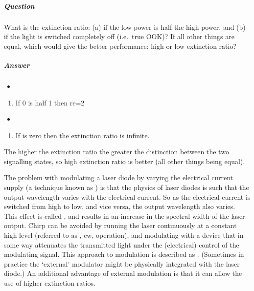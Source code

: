 \documentclass[letterpaper,10pt,english]{sphinxmanual}
\begin{document}
\subparagraph{Question}
\label{\detokenize{content/session_00/Part_00_02:Question}}
What is the extinction ratio: (a) if the low power is half the high power, and (b) if the light is switched completely off (i.e. true OOK)? If all other things are equal, which would give the better performance: high or low extinction ratio?


\subparagraph{Answer}
\label{\detokenize{content/session_00/Part_00_02:Answer}}\begin{itemize}
\item {} 
\end{itemize}
\begin{enumerate}
%
\item {} 
If 0 is half 1 then re=2

\end{enumerate}
\begin{itemize}
\item {} 
\end{itemize}
\begin{enumerate}
%
\setcounter{enumi}{1}
\item {} 
If  is zero then the extinction ratio is infinite.

\end{enumerate}

The higher the extinction ratio the greater the distinction between the two signalling states, so high extinction ratio is better (all other things being equal).

The problem with modulating a laser diode by varying the electrical current supply (a technique known as ) is that the physics of laser diodes is such that the output wavelength varies with the electrical current. So as the electrical current is switched from high to low, and vice versa, the output wavelength also varies. This effect is called , and results in an increase in the spectral width of the laser output. Chirp can be avoided by running the laser continuously
at a constant high level (referred to as , cw, operation), and modulating with a device that in some way attenuates the transmitted light under the (electrical) control of the modulating signal. This approach to modulation is described as . (Sometimes in practice the ‘external’ modulator might be physically integrated with the laser diode.) An additional advantage of external modulation is that it can allow the use of higher extinction ratios.
\end{document}
